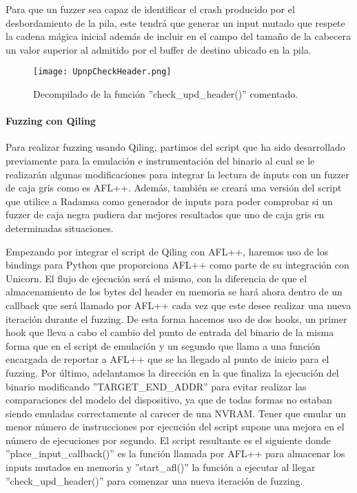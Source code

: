 Para que un fuzzer sea capaz de identificar el crash producido por el desbordamiento de la pila, este tendrá que generar un input mutado que respete la 
cadena mágica inicial además de incluir en el campo del tamaño de la cabecera un valor superior al admitido por el buffer de destino ubicado en la pila.

\begin{figure}[H]
    \centering
    \texttt{[image: UpnpCheckHeader.png]}
    \caption{Decompilado de la función ''check\_upd\_header()'' comentado.}
    \label{fig:UpnpCheckHeader}
\end{figure}

\paragraph{Fuzzing con Qiling}
Para realizar fuzzing usando Qiling, partimos del script que ha sido desarrollado previamente para la emulación e instrumentación del binario al
cual se le realizarán algunas modificaciones para integrar la lectura de inputs con un fuzzer de caja gris como es AFL++\cite{afl++}. Además, también se 
creará una versión del script que utilice a Radamsa\cite{radamsa} como generador de inputs para poder comprobar si un fuzzer de caja negra
pudiera dar mejores resultados que uno de caja gris en determinadas situaciones.\bigskip

Empezando por integrar el script de Qiling con AFL++, haremos uso de los bindings para Python que proporciona AFL++ como parte de su integración
con Unicorn. El flujo de ejecución será el mismo, con la diferencia de que el almacenamiento de los bytes del header en memoria se hará ahora 
dentro de un callback que será llamado por AFL++ cada vez que este desee realizar una nueva iteración durante el fuzzing. De esta forma hacemos
uso de dos hooks, un primer hook que lleva a cabo el cambio del punto de entrada del binario de la misma forma que en el script de emulación y un 
segundo que llama a una función encargada de reportar a AFL++ que se ha llegado al punto de inicio para el fuzzing. Por último, adelantamos la 
dirección en la que finaliza la ejecución del binario modificando ''TARGET\_END\_ADDR'' para evitar realizar las comparaciones del modelo del 
dispositivo, ya que de todas formas no estaban siendo emuladas correctamente al carecer de una NVRAM. Tener que emular un menor número de 
instrucciones por ejecución del script supone una mejora en el número de ejecuciones por segundo. El script resultante es el siguiente donde 
''place\_input\_callback()'' es la función llamada por AFL++ para almacenar los inputs mutados en memoria y ''start\_afl()'' la función a ejecutar 
al llegar ''check\_upd\_header()'' para comenzar una nueva iteración de fuzzing.

